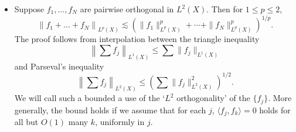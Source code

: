 \begin{itemize}
    \item Suppose $f_1,\dots,f_N$ are pairwise orthogonal in $L^2(X)$. Then for $1 \leq p \leq 2$,
    \[ \left\| f_1 + \dots + f_N \right\|_{L^p(X)} \lesssim \left( \| f_1 \|_{L^p(X)}^p + \cdots + \| f_N \|_{L^p(X)}^p \right)^{1/p}. \]
    The proof follows from interpolation between the triangle inequality
    \[ \left\| \sum f_j \right\|_{L^1(X)} \leq \sum \| f_j \|_{L^1(X)} \]
    and Parseval's inequality
    \[ \left\| \sum f_j \right\|_{L^2(X)} \leq \left( \sum \| f_j \|_{L^2(X)}^2 \right)^{1/2}. \]
    We will call such a bounded a use of the `$L^2$ orthogonality' of the $\{ f_j \}$. More generally, the bound holds if we assume that for each $j$, $\langle f_j, f_k \rangle = 0$ holds for all but $O(1)$ many $k$, uniformly in $j$.



\end{itemize}